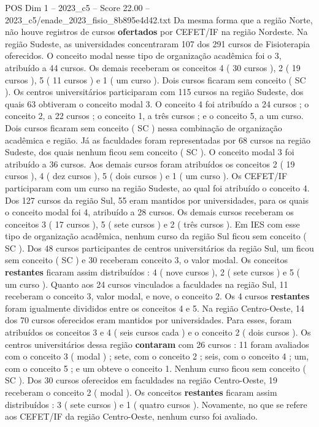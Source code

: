 \begin{textsample}{POS Dim 1 – 2023\_c5 – Score 22.00 – 2023\_c5/enade\_2023\_fisio\_8b895e4d42.txt}
Da mesma forma que a região Norte, não houve registros de cursos \textbf{ofertados} por CEFET/IF na região Nordeste.
Na região Sudeste, as universidades concentraram 107 dos 291 cursos de Fisioterapia oferecidos.
O conceito modal nesse tipo de organização acadêmica foi o 3, atribuído a 44 cursos.
Os demais receberam os conceitos 4 ( 30 cursos ), 2 ( 19 cursos ), 5 ( 11 cursos ) e 1 ( um curso ).
Dois cursos ficaram sem conceito ( SC ).
Os centros universitários participaram com 115 cursos na região Sudeste, dos quais 63 obtiveram o conceito modal 3.
O conceito 4 foi atribuído a 24 cursos ; o conceito 2, a 22 cursos ; o conceito 1, a três cursos ; e o conceito 5, a um curso.
Dois cursos ficaram sem conceito ( SC ) nessa combinação de organização acadêmica e região.
Já as faculdades foram representadas por 68 cursos na região Sudeste, dos quais nenhum ficou sem conceito ( SC ).
O conceito modal 3 foi atribuído a 36 cursos.
Aos demais cursos foram atribuídos os conceitos 2 ( 19 cursos ), 4 ( dez cursos ), 5 ( dois cursos ) e 1 ( um curso ).
Os CEFET/IF participaram com um curso na região Sudeste, ao qual foi atribuído o conceito 4.
Dos 127 cursos da região Sul, 55 eram mantidos por universidades, para os quais o conceito modal foi 4, atribuído a 28 cursos.
Os demais cursos receberam os conceitos 3 ( 17 cursos ), 5 ( sete cursos ) e 2 ( três cursos ).
Em IES com esse tipo de organização acadêmica, nenhum curso da região Sul ficou sem conceito ( SC ).
Dos 48 cursos participantes de centros universitários da região Sul, um ficou sem conceito ( SC ) e 30 receberam conceito 3, o valor modal.
Os conceitos \textbf{restantes} ficaram assim distribuídos : 4 ( nove cursos ), 2 ( sete cursos ) e 5 ( um curso ).
Quanto aos 24 cursos vinculados a faculdades na região Sul, 11 receberam o conceito 3, valor modal, e nove, o conceito 2.
Os 4 cursos \textbf{restantes} foram igualmente divididos entre os conceitos 4 e 5.
Na região Centro-Oeste, 14 dos 70 cursos oferecidos eram mantidos por universidades.
Para esses, foram atribuídos os conceitos 3 e 4 ( seis cursos cada ) e o conceito 2 ( dois cursos ).
Os centros universitários dessa região \textbf{contaram} com 26 cursos : 11 foram avaliados com o conceito 3 ( modal ) ; sete, com o conceito 2 ; seis, com o conceito 4 ; um, com o conceito 5 ; e um obteve o conceito 1.
Nenhum curso ficou sem conceito ( SC ).
Dos 30 cursos oferecidos em faculdades na região Centro-Oeste, 19 receberam o conceito 2 ( modal ).
Os conceitos \textbf{restantes} ficaram assim distribuídos : 3 ( sete cursos ) e 1 ( quatro cursos ).
Novamente, no que se refere aos CEFET/IF da região Centro-Oeste, nenhum curso foi avaliado.

\end{textsample}
